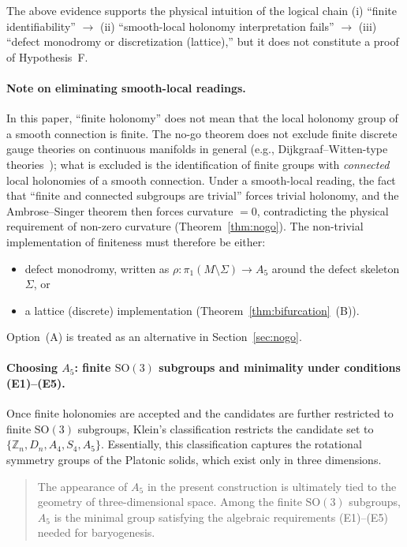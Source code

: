 \documentclass[sn-mathphys-num,Numbered]{sn-jnl}
\theoremstyle{thmstyleone}
\theoremstyle{thmstylethree}
\theoremstyle{thmstyletwo}
\newcommand{\SO}{\mathrm{SO}}
\begin{document}
The above evidence supports the physical intuition of the logical chain
(i) ``finite identifiability'' $\to$ (ii) ``smooth-local holonomy
interpretation fails'' $\to$ (iii) ``defect monodromy or discretization
(lattice),'' but it does not constitute a proof of Hypothesis~F.

\paragraph{Note on eliminating smooth-local readings.}
In this paper, ``finite holonomy'' does not mean that the local
holonomy group of a smooth connection is finite.  The no-go theorem
does not exclude finite discrete gauge theories on continuous manifolds
in general (e.g., Dijkgraaf--Witten-type theories~\cite{DW1990}); what
is excluded is the identification of finite groups with \emph{connected}
local holonomies of a smooth connection.  Under a smooth-local reading,
the fact that ``finite and connected subgroups are trivial'' forces
trivial holonomy, and the Ambrose--Singer theorem then forces curvature
$= 0$, contradicting the physical requirement of non-zero curvature
(Theorem~\ref{thm:nogo}).  The non-trivial implementation of finiteness must
therefore be either:
\begin{itemize}
  \item[(A)] defect monodromy, written as
    $\rho:\pi_1(M\setminus\Sigma)\to A_5$ around the defect skeleton
    $\Sigma$, or
  \item[(B)] a lattice (discrete) implementation (Theorem~\ref{thm:bifurcation}~(B)).
\end{itemize}
Option~(A) is treated as an alternative in Section~\ref{sec:nogo}.

\paragraph{Choosing $A_5$: finite $\SO(3)$ subgroups and minimality under
conditions (E1)--(E5).}
Once finite holonomies are accepted and the candidates are further
restricted to finite $\SO(3)$ subgroups, Klein's classification
restricts the candidate set to
$\{\mathbb{Z}_n, D_n, A_4, S_4, A_5\}$.
Essentially, this classification captures the rotational symmetry groups
of the Platonic solids, which exist only in three dimensions.

\begin{quote}
  The appearance of $A_5$ in the present construction is ultimately tied
  to the geometry of three-dimensional space. Among the finite $\SO(3)$
  subgroups, $A_5$ is the minimal group satisfying the algebraic
  requirements (E1)--(E5) needed for baryogenesis.
\end{quote}
\end{document}
